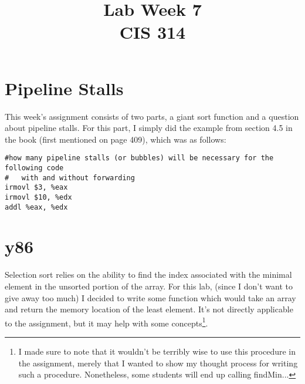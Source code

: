 \documentclass[10pt]{article}
\begin{document}
\title{Lab Week \raisebox{.22ex}{\large\#}7 \\
	CIS 314}
\author{}

\maketitle

\section{Pipeline Stalls}

This week's assignment consists of two parts, a giant sort function and a question about pipeline stalls. For this part, I simply did the example from section 4.5 in the book (first mentioned on page 409), which was as follows:

\begin{lstlisting}
#how many pipeline stalls (or bubbles) will be necessary for the following code
#   with and without forwarding
irmovl $3, %eax
irmovl $10, %edx
addl %eax, %edx

\end{lstlisting}


\section{y86}

Selection sort relies on the ability to find the index associated with the minimal element in the unsorted portion of the array. For this lab, (since I don't want to give away too much) I decided to write some function which would take an array and return the memory location of the least element. It's not directly applicable to the assignment, but it may help with some concepts\footnote{I made sure to note that it wouldn't be terribly wise to use this procedure in the assignment, merely that I wanted to show my thought process for writing such a procedure. Nonetheless, some students will end up calling findMin...}.
\end{document}

